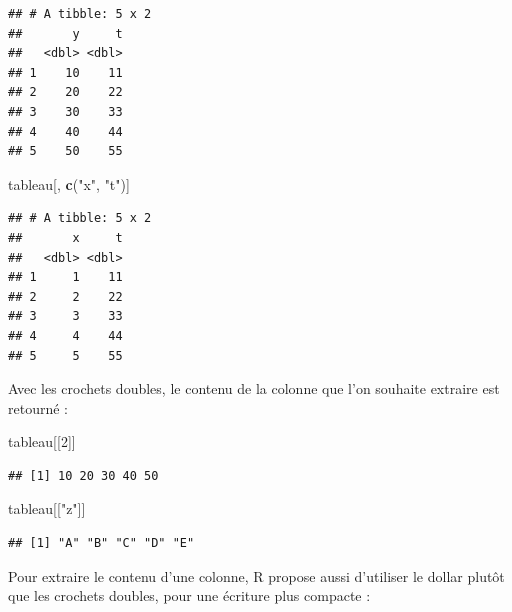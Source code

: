 \documentclass[
  11pt,
]{book}
\newenvironment{Shaded}{\begin{snugshade}}{\end{snugshade}}
\newcommand{\DecValTok}[1]{\textcolor[rgb]{0.00,0.00,0.81}{#1}}
\newcommand{\FunctionTok}[1]{\textcolor[rgb]{0.13,0.29,0.53}{\textbf{#1}}}
\newcommand{\NormalTok}[1]{#1}
\newcommand{\SpecialCharTok}[1]{\textcolor[rgb]{0.81,0.36,0.00}{\textbf{#1}}}
\newcommand{\StringTok}[1]{\textcolor[rgb]{0.31,0.60,0.02}{#1}}
\numberwithin{equation}{section}
\numberwithin{countremarque}{section}
\begin{document}
\begin{lstlisting}
## # A tibble: 5 x 2
##       y     t
##   <dbl> <dbl>
## 1    10    11
## 2    20    22
## 3    30    33
## 4    40    44
## 5    50    55
\end{lstlisting}

\begin{Shaded}
\begin{Highlighting}[]
\NormalTok{tableau[, }\FunctionTok{c}\NormalTok{(}\StringTok{"x"}\NormalTok{, }\StringTok{"t"}\NormalTok{)]}
\end{Highlighting}
\end{Shaded}

\begin{lstlisting}
## # A tibble: 5 x 2
##       x     t
##   <dbl> <dbl>
## 1     1    11
## 2     2    22
## 3     3    33
## 4     4    44
## 5     5    55
\end{lstlisting}

Avec les crochets doubles, le contenu de la colonne que l'on souhaite extraire est retourné :

\begin{Shaded}
\begin{Highlighting}[]
\NormalTok{tableau[[}\DecValTok{2}\NormalTok{]]}
\end{Highlighting}
\end{Shaded}

\begin{lstlisting}
## [1] 10 20 30 40 50
\end{lstlisting}

\begin{Shaded}
\begin{Highlighting}[]
\NormalTok{tableau[[}\StringTok{"z"}\NormalTok{]]}
\end{Highlighting}
\end{Shaded}

\begin{lstlisting}
## [1] "A" "B" "C" "D" "E"
\end{lstlisting}

Pour extraire le contenu d'une colonne, R propose aussi d'utiliser le dollar plutôt que les crochets doubles, pour une écriture plus compacte :

\begin{Shaded}
\end{Shaded}
\end{document}
